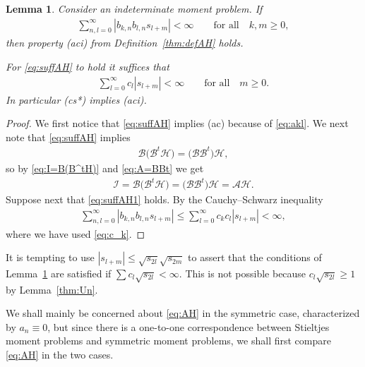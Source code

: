 \documentclass[pdftex]{sigma}
\numberwithin{equation}{section}
\newtheorem{lem}[thm]{Lemma}
\begin{document}
\begin{lem}\label{thm:suffAH} Consider an indeterminate moment problem. If
\begin{gather}\label{eq:suffAH}
\sum_{n,l=0}^\infty |b_{k,n}b_{l,n}s_{l+m}|<\infty\qquad \mbox{for all}\quad k,m\ge 0,
\end{gather}
then property {\rm (aci)} from Definition~{\rm \ref{thm:defAH}} holds.

For \eqref{eq:suffAH} to hold it suffices that
\begin{gather}\label{eq:suffAH1}
\sum_{l=0}^\infty c_l |s_{l+m}|<\infty\qquad\mbox{for all}\quad m\ge 0.
\end{gather}
In particular {\rm (cs*)} implies {\rm (aci)}.
\end{lem}

\begin{proof} We first notice that \eqref{eq:suffAH} implies (ac) because of \eqref{eq:akl}. We next note that \eqref{eq:suffAH} implies
\begin{gather*}
\mathcal B\big(\mathcal B^t\mathcal H\big)=\big(\mathcal B\mathcal B^t\big)\mathcal H,
\end{gather*}
so by \eqref{eq:I=B(B^tH)} and \eqref{eq:A=BBt} we get
\begin{gather*}
\mathcal I=\mathcal B\big(\mathcal B^t\mathcal H\big)=\big(\mathcal B\mathcal B^t\big)\mathcal H=\mathcal A\mathcal H.
\end{gather*}
Suppose next that \eqref{eq:suffAH1} holds. By the Cauchy--Schwarz inequality
\begin{gather*}
\sum_{n,l=0}^\infty |b_{k,n}b_{l,n}s_{l+m}|\le \sum_{l=0}^\infty c_kc_l|s_{l+m}|<\infty,
\end{gather*}
where we have used \eqref{eq:c_k}.
\end{proof}

\begin{rem}\label{thm:c-sqrt} It is tempting to use $|s_{l+m}|\le \sqrt{s_{2l}}\sqrt{s_{2m}}$ to assert that the conditions of Lem\-ma~\ref{thm:suffAH} are satisfied if $\sum c_l\sqrt{s_{2l}}<\infty$. This is not possible because $c_l\sqrt{s_{2l}}\ge 1$ by Lemma~\ref{thm:Un}.
\end{rem}

We shall mainly be concerned about \eqref{eq:AH} in the symmetric case, characterized by $a_n\equiv 0$, but since there is a one-to-one correspondence between Stieltjes moment problems and symmetric moment problems, we shall first compare \eqref{eq:AH} in the two cases.
\end{document}
